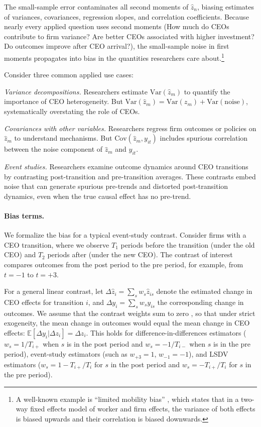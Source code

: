 \documentclass[11pt,a4paper]{article}
\newcommand{\Var}{\text{Var}}
\newcommand{\Cov}{\text{Cov}}
\begin{document}
The small-sample error contaminates all second moments of $\hat z_n$, biasing estimates of variances, covariances, regression slopes, and correlation coefficients. Because nearly every applied question uses second moments (How much do CEOs contribute to firm variance? Are better CEOs associated with higher investment? Do outcomes improve after CEO arrival?), the small-sample noise in first moments propagates into bias in the quantities researchers care about.\footnote{A well-known example is ``limited mobility bias'' \citep{andrews2008high}, which states that in a two-way fixed effects model of worker and firm effects, the variance of both effects is biased upwards and their correlation is biased downwards.}

Consider three common applied use cases:

\textit{Variance decompositions.} Researchers estimate $\Var(\hat z_m)$ to quantify the importance of CEO heterogeneity. But $\Var(\hat z_m) = \Var(z_m) + \Var(\text{noise})$, systematically overstating the role of CEOs.

\textit{Covariances with other variables.} Researchers regress firm outcomes or policies on $\hat z_m$ to understand mechanisms. But $\Cov(\hat z_m, y_{it})$ includes spurious correlation between the noise component of $\hat z_m$ and $y_{it}$.

\textit{Event studies.} Researchers examine outcome dynamics around CEO transitions by contrasting post-transition and pre-transition averages. These contrasts embed noise that can generate spurious pre-trends and distorted post-transition dynamics, even when the true causal effect has no pre-trend.

\paragraph{Bias terms.} We formalize the bias for a typical event-study contrast. Consider firms with a CEO transition, where we observe $T_1$ periods before the transition (under the old CEO) and $T_2$ periods after (under the new CEO). The contrast of interest compares outcomes from the post period to the pre period, for example, from $t=-1$ to $t=+3$. 

For a general linear contrast, let $\Delta \hat z_i = \sum_s w_s \hat z_{is}$ denote the estimated change in CEO effects for transition $i$, and $\Delta y_i = \sum_s w_s y_{is}$ the corresponding change in outcomes. We assume that the contrast weights sum to zero , so that under strict exogeneity, the mean change in outcomes would equal the mean change in CEO effects: $\mathbb E[\Delta y_i|\Delta z_i] = \Delta z_i$. This holds for difference-in-differences estimators ($w_s = 1/T_{i+}$ when $s$ is in the post period and $w_s = -1/T_{i-}$ when $s$ is in the pre period), event-study estimators (such as $w_{+3}=1$, $w_{-1}=-1$), and LSDV estimators ($w_s = 1-T_{i+}/T_i$ for $s$ in the post period and $w_s = -T_{i+}/T_i$ for $s$ in the pre period).
\end{document}
